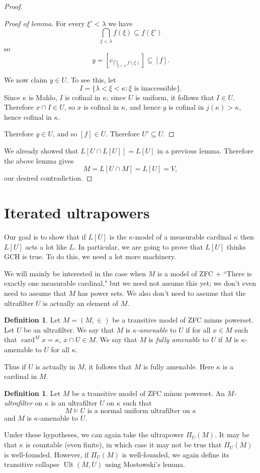 \documentclass[12pt]{report}
\newcommand{\card}{\operatorname{card}}
\DeclareMathOperator{\Ult}{Ult}
\newcommand{\dfn}[1]{\emph{#1}\index{#1}}
\theoremstyle{definition}
\newtheorem{definition}[theorem]{Definition}
\begin{document}
\begin{proof}
\begin{proof}[Proof of lemma]
For every $\xi' < \lambda$ we have
$$\bigcap_{\xi < \lambda} f(\xi) \subseteq f(\xi')$$
so
$$y = \left[c_{\bigcap_{\xi < \lambda} f(\xi)} \right] \subseteq [f].$$

We now claim $y \in U$. To see this, let
$$I = \{\lambda < \xi < \kappa: \text{$\xi$ is inaccessible}\}.$$
Since $\kappa$ is Mahlo, $I$ is cofinal in $\kappa$; since $U$ is uniform, it follows that $I \in U$.
Therefore $x \cap I \in U$, so $x$ is cofinal in $\kappa$, and hence $y$ is cofinal in $j(\kappa) > \kappa$, hence cofinal in $\kappa$.

Therefore $y \in U$, and so $[f] \in U$. Therefore $U' \subseteq U$.
\end{proof}
We already showed that $L[U \cap L[U]] = L[U]$ in a previous lemma. Therefore the above lemma gives
$$M = L[U \cap M] = L[U] = V,$$
our desired contradiction.
\end{proof}

\section{Iterated ultrapowers}
Our goal is to show that if $L[U]$ is the $\kappa$-model of a measurable cardinal $\kappa$ then $L[U]$ acts a lot like $L$. In particular, we are going to prove that $L[U]$ thinks GCH is true.
To do this, we need a lot more machinery.

We will mainly be interested in the case when $M$ is a model of ZFC + ``There is exactly one measurable cardinal," but we need not assume this yet; we don't even need to assume that $M$ has power sets.
We also don't need to assume that the ultrafilter $U$ is actually an element of $M$.

\begin{definition}
Let $M = (M, \in)$ be a transitive model of ZFC minus powerset. Let $U$ be an ultrafilter. We say that $M$ is \dfn{$\kappa$-amenable} to $U$ if for all $x \in M$ such that $\card^M x = \kappa$, $x \cap U \in M$. We say that $M$ is \dfn{fully amenable} to $U$ if $M$ is $\kappa$-amenable to $U$ for all $\kappa$.
\end{definition}
Thus if $U$ is actually in $M$, it follows that $M$ is fully amenable. Here $\kappa$ is a cardinal in $M$.

\begin{definition}
Let $M$ be a transitive model of ZFC minus powerset. An \dfn{$M$-ultrafilter} on $\kappa$ is an ultrafilter $U$ on $\kappa$ such that
$$M \models \text{$U$ is a normal uniform ultrafilter on $\kappa$}$$
and $M$ is $\kappa$-amenable to $U$.
\end{definition}
Under these hypotheses, we can again take the ultrapower $\Pi_U(M)$.
It may be that $\kappa$ is countable (even finite), in which case it may not be true that $\Pi_U(M)$ is well-founded.
However, if $\Pi_U(M)$ is well-founded, we again define its transitive collapse $\Ult(M, U)$ using Mostowski's lemma.
\end{document}
